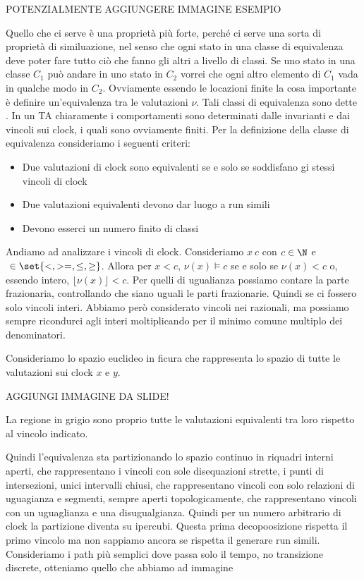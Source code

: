 POTENZIALMENTE AGGIUNGERE IMMAGINE ESEMPIO

Quello che ci serve è una proprietà più forte, perché ci serve una sorta di proprietà di similuazione, nel senso che ogni stato in una classe di equivalenza deve poter fare tutto ciò che fanno gli altri a livello di classi. Se uno stato in una classe \(C_1\) può andare in uno stato in \(C_2\) vorrei che ogni altro elemento di \(C_1\) vada in qualche modo in \(C_2\). Ovviamente essendo le locazioni finite la cosa importante è definire un'equivalenza tra le valutazioni \(\nu\). Tali classi di equivalenza sono dette . In un TA chiaramente i comportamenti sono determinati dalle invarianti e dai vincoli sui clock, i quali sono ovviamente finiti. Per la definizione della classe di equivalenza consideriamo i seguenti criteri:

\begin{itemize} 
  \item Due valutazioni di clock sono equivalenti se e solo se soddisfano gi stessi vincoli di clock
  \item Due valutazioni equivalenti devono dar luogo a run simili
  \item Devono esserci un numero finito di classi
\end{itemize}

Andiamo ad analizzare i vincoli di clock. Consideriamo \(x ~ c\) con \(c \in \N\) e \(~ \in \set{<,> =,\leq,\geq}\).
Allora per \(x<c\), \(\nu(x)\models c\) se e solo se \(\nu(x)< c\) o, essendo intero, \(\lfloor \nu(x) \rfloor < c\). Per quelli di ugualianza possiamo contare la parte frazionaria, controllando che siano uguali le parti frazionarie. Quindi se ci fossero solo vincoli interi. Abbiamo però considerato vincoli nei razionali, ma possiamo sempre ricondurci agli interi moltiplicando per il minimo comune multiplo dei denominatori. 

Consideriamo lo spazio euclideo in ficura che rappresenta lo spazio di tutte le valutazioni sui clock \(x\) e \(y\).

AGGIUNGI IMMAGINE DA SLIDE!

La regione in grigio sono proprio tutte le valutazioni equivalenti tra loro rispetto al vincolo indicato.

Quindi l'equivalenza sta partizionando lo spazio continuo in riquadri interni aperti, che rappresentano i vincoli con sole disequazioni strette, i punti di intersezioni, unici intervalli chiusi, che rappresentano vincoli con solo relazioni di uguagianza e segmenti, sempre aperti topologicamente, che rappresentano vincoli con un uguaglianza e una disugualgianza. Quindi per un numero arbitrario di clock la partizione diventa su ipercubi. Questa prima decopoosizione rispetta il primo vincolo ma non sappiamo ancora se rispetta il generare run simili. Consideriamo i path più semplici dove passa solo il tempo, no transizione discrete, otteniamo quello che abbiamo ad immagine

